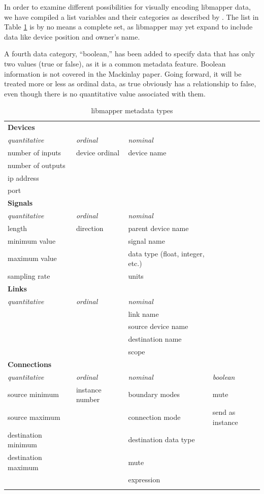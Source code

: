 In order to examine different possibilities for visually encoding libmapper data, we have compiled a list variables and their categories as described by . The list in Table \ref{tab:metadata_types} is by no means a complete set, as libmapper may yet expand to include data like device position and owner's name.

A fourth data category, ``boolean,'' has been added to specify data that has only two values (true or false), as it is a common metadata feature. Boolean information is not covered in the Mackinlay paper. Going forward, it will be treated more or less as ordinal data, as true obviously has a relationship to false, even though there is no quantitative value associated with them.

\newpage

\begin{longtable}{l l p{4cm} l}
\caption[libmapper metadata types]{libmapper metadata types} \label{tab:metadata_types} \\

	\hline\hline
	\textbf{Devices} & & \\
	\emph{quantitative} & \emph{ordinal} & \emph{nominal}\\
	\hline
	number of inputs & device ordinal & device name\\
		number of outputs \\
	ip address \\
	port \\ [0.7cm]

	\hline\hline
	\textbf{Signals} & & \\
	\emph{quantitative} & \emph{ordinal} & \emph{nominal}\\
	\hline
	length & direction & parent device name\\
	minimum value & & signal name \\
	maximum value & & data type (float, integer, etc.)\\
	sampling rate & & units \\ [0.7cm]

	\hline\hline
	\textbf{Links} & & \\
	\emph{quantitative} & \emph{ordinal} & \emph{nominal}\\
	\hline
	& & link name \\
	& & source device name \\
	& & destination name \\
	& & scope \\ [0.7cm]

	\hline\hline
	\textbf{Connections} & & \\
	\emph{quantitative} & \emph{ordinal} & \emph{nominal} & \emph{boolean}\\
	\hline
	source minimum & instance number & boundary modes & mute\\
	source maximum & & connection mode & send as instance\\
	destination minimum & & destination data type \\
	destination maximum & & mute \\
	& & expression \\
	& & \\
\end{longtable}



